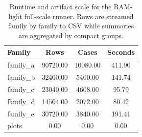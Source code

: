 \begin{table}[t]
\centering
\small
\caption{Runtime and artifact scale for the RAM-light full-scale runner. Rows are streamed family by family to CSV while summaries are aggregated by compact groups.}
\label{tab:runtime-memory}
\begin{tabular}{lccc}
\toprule
Family & Rows & Cases & Seconds \\
\midrule
family\_a & 90720.00 & 10080.00 & 411.90 \\
family\_b & 32400.00 & 5400.00 & 141.74 \\
family\_c & 23040.00 & 4608.00 & 95.79 \\
family\_d & 14504.00 & 2072.00 & 80.42 \\
family\_e & 30720.00 & 3840.00 & 191.41 \\
plots & 0.00 & 0.00 & 0.00 \\
\bottomrule
\end{tabular}
\end{table}
